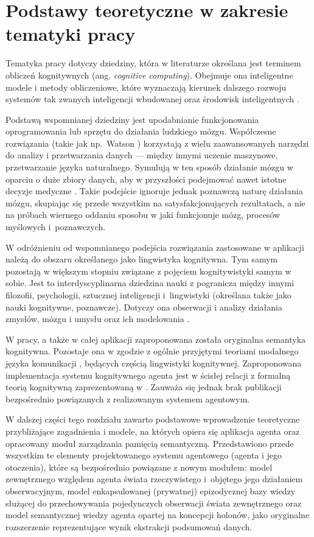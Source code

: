 
\chapter{Podstawy teoretyczne w zakresie tematyki pracy}

Tematyka pracy dotyczy dziedziny, która w literaturze określana jest terminem obliczeń kognitywnych (ang. \textit{cognitive computing}). Obejmuje ona inteligentne modele i metody obliczeniowe, które wyznaczają kierunek dalszego rozwoju systemów tak zwanych inteligencji wbudowanej oraz środowisk inteligentnych \cite{hur15}.

Podstawą wspomnianej dziedziny jest upodabnianie funkcjonowania oprogramowania lub sprzętu do działania ludzkiego mózgu. Współczesne rozwiązania (takie jak np.\ Watson \cite{kel13}) korzystają z wielu zaawansowanych narzędzi do analizy i przetwarzania danych --- między innymi uczenie maszynowe, przetwarzanie języka naturalnego. Symulują w ten sposób działanie mózgu w oparciu o duże zbiory danych, aby w przyszłości podejmować nawet istotne decyzje medyczne \cite{woo15}. Takie podejście ignoruje jednak poznawczą naturę działania mózgu, skupiając się przede wszystkim na satysfakcjonujących rezultatach, a nie na próbach wiernego oddaniu sposobu w jaki funkcjonuje mózg, procesów myślowych i~poznawczych.

W odróżnieniu od wspomnianego podejścia rozwiązania zastosowane w aplikacji należą do obszaru określanego jako lingwistyka kognitywna. Tym samym pozostają w większym stopniu związane z pojęciem kognitywistyki samym w sobie. Jest to interdyscyplinarna dziedzina nauki z pogranicza między innymi filozofii, psychologii, sztucznej inteligencji i~lingwistyki (określana także jako nauki kognitywne, poznawcze). Dotyczy ona obserwacji i analizy działania zmysłów, mózgu i umysłu oraz ich modelowania \cite{tha17}.

W pracy, a także w całej aplikacji zaproponowana została oryginalna semantyka kognitywna. Pozostaje ona w zgodzie z ogólnie przyjętymi teoriami modalnego języka komunikacji \cite{tal00}, będących częścią lingwistyki kognitywnej. Zaproponowana implementacja systemu kognitywnego agenta jest w ścisłej relacji z formalną teorią kognitywną zaprezentowaną w \cite{kat07}. Zauważa się jednak brak publikacji bezpośrednio powiązanych z realizowanym systemem agentowym.

W dalszej części tego rozdziału zawarto podstawowe wprowadzenie teoretyczne przybliżające zagadnienia i modele, na których opiera się aplikacja agenta oraz opracowany moduł zarządzania pamięcią semantyczną. Przedstawiono przede wszystkim te elementy projektowanego systemu agentowego (agenta i jego otoczenia), które są bezpośrednio powiązane z nowym modułem: model zewnętrznego względem agenta świata rzeczywistego i~objętego jego działaniem obserwacyjnym, model enkapsulowanej (prywatnej) epizodycznej bazy wiedzy służącej do przechowywania pojedynczych obserwacji świata zewnętrznego oraz model semantycznej wiedzy agenta opartej na koncepcji holonów, jako oryginalne rozszerzenie reprezentujące wynik ekstrakcji podsumowań danych.

